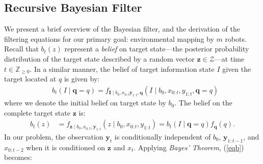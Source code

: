 \documentclass[letterpaper, 10 pt, conference]{ieeeconf}
\newcommand{\Ram}[1]{{\normalsize{\textbf{({\color{green}Ram:\ }#1)}}}}
\begin{document}
\subsection{Recursive Bayesian Filter}
We present a brief overview of the Bayesian filter, and the derivation of the filtering equations for our primary goal: environmental mapping by $m$ robots. 
Recall that $b_t(z)$ represent a \emph{belief} on target state---the posterior probability distribution of the target state described by a random vector $\bm{z} \in \mathcal{Z}$---at time $t \in \mathbb{Z}_{\geq 0}$. 
In a similar manner, the belief of target information state $I$ given the target located at $q$ is given by:
\begin{align}
&b_t(I \mid \bm{q} = q) = f_{\bm{I}\mid b_0,{x}_{0:t}\bm{y}_{1:t},\bm{q}}\left(I \mid b_0,{x}_{0:t},y_{1:t},\bm{q}=q\right)
\label{eqb}
\end{align}
where we denote the initial belief on target state by $b_0$.
The belief on the complete target state $\bm{z}$ is:
\begin{align}
b_t(z)&=
f_{\bm{z} \mid b_0,{x}_{0:t},\bm{y}_{1:t}}
\left(
z \mid b_0,
{x}_{0:t},y_{1:t}
\right) =
b_t(I\mid \bm{q}=q)f_{\bm{q}}(q). 
\label{eq0}
\end{align}
In our problem, the observation $\bm{y}_{t}$ is conditionally independent of $b_0$, $\bm{y}_{1:t-1}$, and $x_{0:t-2}$ when it is conditioned on $\bm{z}$ and $x_t$. Applying \emph{Bayes' Theorem}, (\ref{eqb}) becomes:
\end{document}
